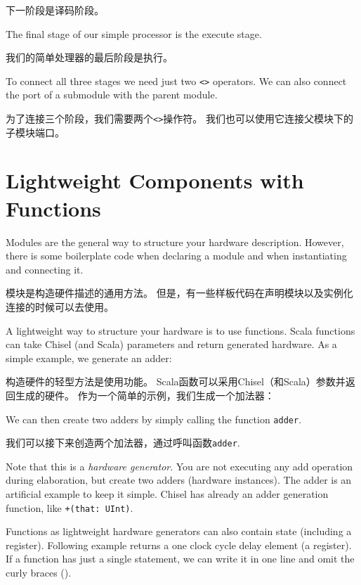 \documentclass[%
    10pt,
    headinclude, footexclude,
    openright, %
    notitlepage,
    cleardoubleempty,
    headsepline,
    pointlessnumbers,
    bibtotoc, idxtotoc,
    ]{scrbook}
\newcommand{\code}[1]{{\small{\texttt{#1}}}}
\begin{document}
\noindent 下一阶段是译码阶段。


\noindent The final stage of our simple processor is the execute stage.

\noindent 我们的简单处理器的最后阶段是执行。


To connect all three stages we need just two \code{<>} operators.
We can also connect the port of a submodule with the parent module.

为了连接三个阶段，我们需要两个\code{<>}操作符。
我们也可以使用它连接父模块下的子模块端口。




\section{Lightweight Components with Functions}

Modules are the general way to structure your hardware description.
However, there is some boilerplate code when declaring a module and when instantiating and
connecting it.


模块是构造硬件描述的通用方法。
但是，有一些样板代码在声明模块以及实例化连接的时候可以去使用。

A lightweight way to structure your hardware is to use functions.
Scala functions can take Chisel (and Scala) parameters and return generated hardware.
As a simple example, we generate an adder:

构造硬件的轻型方法是使用功能。
Scala函数可以采用Chisel（和Scala）参数并返回生成的硬件。
作为一个简单的示例，我们生成一个加法器：


\noindent We can then create two adders by simply calling the function \code{adder}.

\noindent 我们可以接下来创造两个加法器，通过呼叫函数\code{adder}.


\noindent Note that this is a \emph{hardware generator}. You are not executing any add operation
during elaboration, but create two adders (hardware instances). The adder is an artificial example
to keep it simple. Chisel has already an adder generation function, like \code{+(that: UInt)}.

Functions as lightweight hardware generators can also contain state (including a register).
Following example returns a one clock cycle delay element (a register).
If a function has just a single statement, we can write it in one line and omit the curly
braces ({}).
\end{document}
